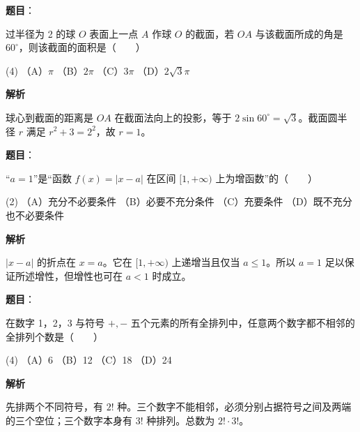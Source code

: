 \begin{answer}

\textbf{题目}：

过半径为 2 的球 $O$ 表面上一点 $A$ 作球 $O$ 的截面，若 $OA$ 与该截面所成的角是 $60^\circ$，则该截面的面积是\mbox{（　　）}

\begin{gkopts}(4)
\task （A）$\pi$
\task （B）$2\pi$
\task （C）$3\pi$
\task （D）$2\sqrt3\pi$
\end{gkopts}

\textbf{解析}

球心到截面的距离是 $OA$ 在截面法向上的投影，等于 $2\sin60^\circ=\sqrt3$。截面圆半径 $r$ 满足 $r^2+3=2^2$，故 $r=1$。


\end{answer}
\begin{answer}

\textbf{题目}：

“$a=1$”是“函数 $f(x)=|x-a|$ 在区间 $[1,+\infty)$ 上为增函数”的\mbox{（　　）}

\begin{gkopts}(2)
\task （A）充分不必要条件
\task （B）必要不充分条件
\task （C）充要条件
\task （D）既不充分也不必要条件
\end{gkopts}

\textbf{解析}

$|x-a|$ 的折点在 $x=a$。它在 $[1,+\infty)$ 上递增当且仅当 $a\leqslant1$。所以 $a=1$ 足以保证所述增性，但增性也可在 $a<1$ 时成立。


\end{answer}
\begin{answer}

\textbf{题目}：

在数字 1，2，3 与符号 $+,-$ 五个元素的所有全排列中，任意两个数字都不相邻的全排列个数是\mbox{（　　）}

\begin{gkopts}(4)
\task （A）6
\task （B）12
\task （C）18
\task （D）24
\end{gkopts}

\textbf{解析}

先排两个不同符号，有 $2!$ 种。三个数字不能相邻，必须分别占据符号之间及两端的三个空位；三个数字本身有 $3!$ 种排列。总数为 $2!\cdot3!$。


\end{answer}
